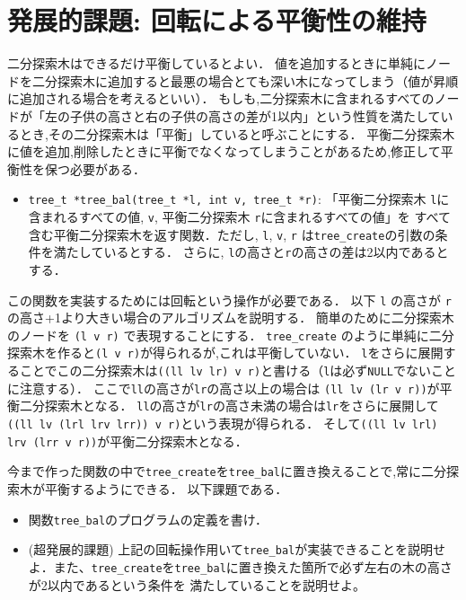 \documentclass[a4paper,twoside,onecolumn,openany,article]{memoir}
\theoremstyle{remark}
\begin{document}
\section{発展的課題: 回転による平衡性の維持}
二分探索木はできるだけ平衡しているとよい．
値を追加するときに単純にノードを二分探索木に追加すると最悪の場合とても深い木になってしまう（値が昇順に追加される場合を考えるといい）．
もしも,二分探索木に含まれるすべてのノードが「左の子供の高さと右の子供の高さの差が1以内」という性質を満たしているとき,その二分探索木は「平衡」していると呼ぶことにする．
平衡二分探索木に値を追加,削除したときに平衡でなくなってしまうことがあるため,修正して平衡性を保つ必要がある．
\begin{itemize}
\item \texttt{tree\_t *tree\_bal(tree\_t *l, int v, tree\_t *r)}: 「平衡二分探索木 \texttt{l}に含まれるすべての値, \texttt{v}, 平衡二分探索木 \texttt{r}に含まれるすべての値」を
すべて含む平衡二分探索木を返す関数．ただし, \texttt{l}, \texttt{v}, \texttt{r} は\texttt{tree\_create}の引数の条件を満たしているとする．
さらに, \texttt{l}の高さと\texttt{r}の高さの差は2以内であるとする．
\end{itemize}
この関数を実装するためには回転という操作が必要である．
以下 \texttt{l} の高さが \texttt{r} の高さ+1より大きい場合のアルゴリズムを説明する．
簡単のために二分探索木のノードを \texttt{(l v r)} で表現することにする．
\texttt{tree\_create} のように単純に二分探索木を作ると\texttt{(l v r)}が得られるが,これは平衡していない．
\texttt{l}をさらに展開することでこの二分探索木は\texttt{((ll lv lr) v r)}と書ける（\texttt{l}は必ず\texttt{NULL}でないことに注意する）．
ここで\texttt{ll}の高さが\texttt{lr}の高さ以上の場合は
\texttt{(ll lv (lr v r))}が平衡二分探索木となる．
\texttt{ll}の高さが\texttt{lr}の高さ未満の場合は\texttt{lr}をさらに展開して
\texttt{((ll lv (lrl lrv lrr)) v r)}という表現が得られる．
そして\texttt{((ll lv lrl) lrv (lrr v r))}が平衡二分探索木となる．

今まで作った関数の中で\texttt{tree\_create}を\texttt{tree\_bal}に置き換えることで,常に二分探索木が平衡するようにできる．
以下課題である．
\begin{itemize}
\item 関数\texttt{tree\_bal}のプログラムの定義を書け．
\item (超発展的課題) 上記の回転操作用いて\texttt{tree\_bal}が実装できることを説明せよ．また、\texttt{tree\_create}を\texttt{tree\_bal}に置き換えた箇所で必ず左右の木の高さが2以内であるという条件を
満たしていることを説明せよ。
\end{itemize}
\end{document}
